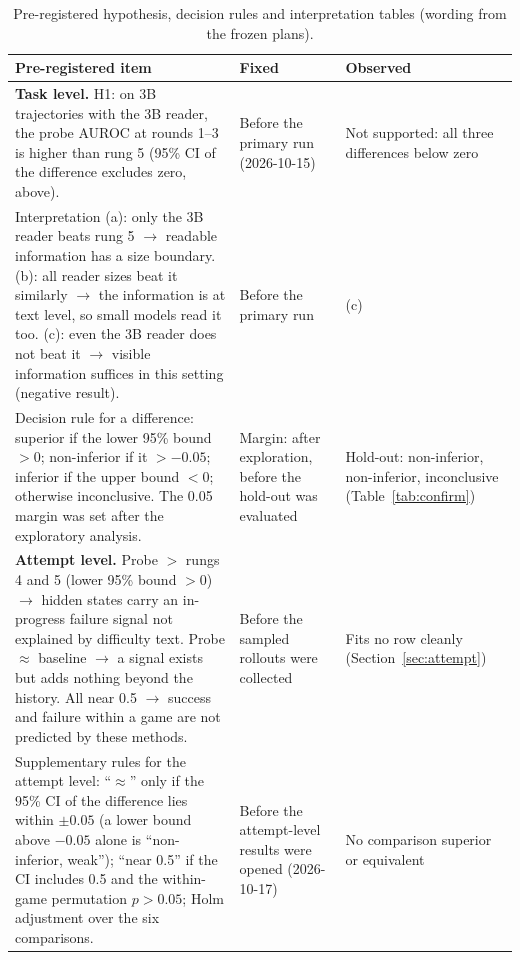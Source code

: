 \begin{table}[htbp]
\centering\small
\caption{Pre-registered hypothesis, decision rules and interpretation tables (wording from the frozen plans).}\label{tab:a7}
\begin{tabularx}{\linewidth}{@{}L>{\raggedright\arraybackslash}p{2.9cm}>{\raggedright\arraybackslash}p{2.9cm}@{}}
\toprule
Pre-registered item & Fixed & Observed \\
\midrule
\textbf{Task level.} H1: on 3B trajectories with the 3B reader, the probe AUROC at rounds 1--3 is higher than rung 5 (95\% CI of the difference excludes zero, above). & Before the primary run (2026-10-15) & Not supported: all three differences below zero \\
\addlinespace
Interpretation (a): only the 3B reader beats rung 5 $\rightarrow$ readable information has a size boundary. (b): all reader sizes beat it similarly $\rightarrow$ the information is at text level, so small models read it too. (c): even the 3B reader does not beat it $\rightarrow$ visible information suffices in this setting (negative result). & Before the primary run & (c) \\
\addlinespace
Decision rule for a difference: superior if the lower 95\% bound $> 0$; non-inferior if it $> -0.05$; inferior if the upper bound $< 0$; otherwise inconclusive. The 0.05 margin was set after the exploratory analysis. & Margin: after exploration, before the hold-out was evaluated & Hold-out: non-inferior, non-inferior, inconclusive (Table~\ref{tab:confirm}) \\
\addlinespace
\textbf{Attempt level.} Probe $>$ rungs 4 and 5 (lower 95\% bound $> 0$) $\rightarrow$ hidden states carry an in-progress failure signal not explained by difficulty text. Probe $\approx$ baseline $\rightarrow$ a signal exists but adds nothing beyond the history. All near 0.5 $\rightarrow$ success and failure within a game are not predicted by these methods. & Before the sampled rollouts were collected & Fits no row cleanly (Section~\ref{sec:attempt}) \\
\addlinespace
Supplementary rules for the attempt level: ``$\approx$'' only if the 95\% CI of the difference lies within $\pm 0.05$ (a lower bound above $-0.05$ alone is ``non-inferior, weak''); ``near 0.5'' if the CI includes 0.5 and the within-game permutation $p > 0.05$; Holm adjustment over the six comparisons. & Before the attempt-level results were opened (2026-10-17) & No comparison superior or equivalent \\
\bottomrule
\end{tabularx}
\par\smallskip\raggedright\footnotesize
\end{table}
